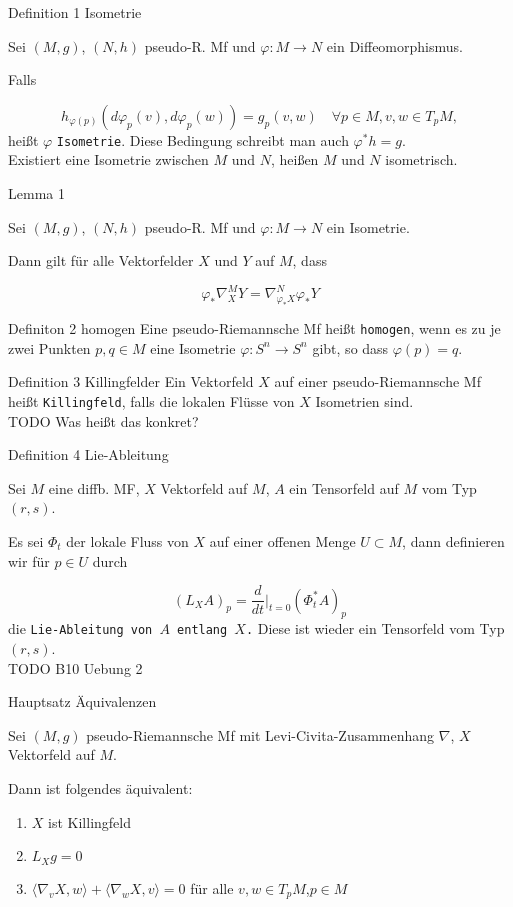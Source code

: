 \documentclass[a6paper,11pt,grid=front]{kartei}
\newcommand{\fl}[1]{\begin{flushleft}
 #1 \end{flushleft}}
\newcounter{def}
\newcounter{satz}
\newcommand{\defreset}{\setcounter{def}{1}}
\newcommand{\satzreset}{\setcounter{satz}{1}}
\begin{document}
\nonameyet
{Definition 1} {Isometrie}
{
Sei $(M,g)$, $(N,h)$ pseudo-R. Mf und $\varphi : M \to N$ ein Diffeomorphismus.
\fl{Falls}
\[
h_{\varphi(p)}(d\varphi_p(v), d\varphi_p(w)) = g_p (v,w) 
\quad \forall p\in M, v,w \in T_pM,
\]
heißt $\varphi$ \texttt{Isometrie}. Diese Bedingung schreibt man auch
$\varphi^* h = g$.
\\
Existiert eine Isometrie zwischen $M$ und $N$, heißen $M$ und $N$ 
isometrisch.
}
{}

\nonameyet
{Lemma 1} {}
{
Sei $(M,g)$, $(N,h)$ pseudo-R. Mf und $\varphi : M \to N$ ein Isometrie. 
\fl{Dann gilt für alle Vektorfelder $X$ und $Y$ auf $M$,
dass }
\[
\varphi_*\nabla^M_X Y = \nabla^N_ {\varphi_* X} \varphi_* Y
\]
}
{}

\nonameyet
{Definiton 2} {homogen}
{
Eine pseudo-Riemannsche Mf heißt \texttt{homogen}, wenn es zu je zwei Punkten
$p,q \in M$ eine Isometrie $\varphi: S^n \to S^n$ gibt, so dass 
$\varphi(p) = q$.
}
{}

\nonameyet
{Definition 3} {Killingfelder}
{
Ein Vektorfeld $X$ auf einer pseudo-Riemannsche Mf heißt \texttt{Killingfeld},
falls die lokalen Flüsse von $X$ Isometrien sind.
\\
TODO Was heißt das konkret? 
}
{}

\nonameyet
{Definition 4} {Lie-Ableitung}
{
Sei $M$ eine diffb. MF, $X$ Vektorfeld auf $M$, $A$ ein Tensorfeld auf $M$ vom
Typ $(r,s)$.
\fl{Es sei $\Phi_t$ der lokale Fluss von $X$ auf einer offenen Menge 
$U \subset M$, dann definieren wir für $p \in U$ durch}
\[
(L_X A)_p = \frac{d}{dt}\bigg|_{t=0} (\Phi^* _t  A)_p
\]
die \texttt{Lie-Ableitung von $A$ entlang $X$.} 
Diese ist wieder ein Tensorfeld vom Typ $(r,s)$.
\\
TODO B10 Uebung 2
}
{}

\nonameyet
{Hauptsatz} {Äquivalenzen}
{
Sei $(M,g)$ pseudo-Riemannsche Mf mit Levi-Civita-Zusammenhang $\nabla$,
$X$ Vektorfeld auf $M$. 
\fl{Dann ist folgendes äquivalent:}
\begin{enumerate}[1.]
\item $X$ ist Killingfeld
\item $L_X g = 0$
\item $\langle \nabla_v X, w \rangle + \langle \nabla_w X, v\rangle = 0$
für alle $v,w \in T_pM$,$p\in M$
\end{enumerate}
}
{}
\defreset
\satzreset
\end{document}
